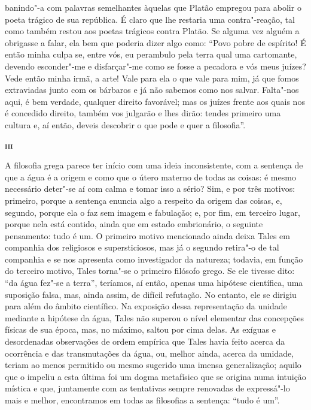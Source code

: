  banindo"-a com palavras semelhantes àquelas que Platão empregou para abolir
 o poeta trágico de sua república. É claro que lhe restaria uma
 contra"-reação, tal como também restou aos poetas trágicos contra Platão. Se
 alguma vez alguém a obrigasse a falar, ela bem que poderia dizer algo como:
 ``Povo pobre de espírito! É então minha culpa se, entre vós, eu perambulo
 pela terra qual uma cartomante, devendo esconder"-me e disfarçar"-me como se
 fosse a pecadora e vós meus juízes? Vede então minha irmã, a arte! Vale para
 ela o que vale para mim, já que fomos extraviadas junto com os bárbaros e já
 não sabemos como nos salvar. Falta"-nos aqui, é bem verdade, qualquer
 direito favorável; mas os juízes frente aos quais nos é concedido direito,
 também vos julgarão e lhes dirão: tendes primeiro uma cultura e, aí então,
 deveis descobrir o que pode e quer a filosofia''.
 
 \bigskip
\textsc{\textbf{iii}}
\bigskip

A filosofia grega parece ter início com uma ideia inconsistente, com a
sentença de que a água é a origem e como que o útero materno de todas as
coisas: é mesmo necessário deter"-se aí com calma e tomar isso a sério? Sim,
e por três motivos: primeiro, porque a sentença enuncia algo a respeito da
origem das coisas, e, segundo, porque ela o faz sem imagem e fabulação; e,
por fim, em terceiro lugar, porque nela está contido, ainda que em estado
embrionário, o seguinte pensamento: tudo é um. O primeiro motivo mencionado
ainda deixa Tales em companhia dos religiosos e supersticiosos, mas já o
segundo retira"-o de tal companhia e se nos apresenta como investigador da
natureza; todavia, em função do terceiro motivo, Tales torna"-se o primeiro
filósofo grego. Se ele tivesse dito: ``da água fez"-se a terra'', teríamos,
aí então, apenas uma hipótese científica, uma suposição falsa, mas, ainda
assim, de difícil refutação. No entanto, ele se dirigiu para além do âmbito
científico. Na exposição dessa representação da unidade mediante a hipótese
da água, Tales não superou o nível elementar das concepções físicas de sua
época, mas, no máximo, saltou por cima delas. As exíguas e desordenadas
observações de ordem empírica que Tales havia feito acerca da ocorrência e
das transmutações da água, ou, melhor ainda, acerca da umidade, teriam ao
menos permitido ou mesmo sugerido uma imensa generalização; aquilo que o
impeliu a esta última foi um dogma \label{foiumdogma} metafísico que se
origina numa intuição mística e que, juntamente com as tentativas sempre
renovadas de expressá"-lo mais e melhor, encontramos em todas as filosofias a
sentença: ``tudo é um''.

